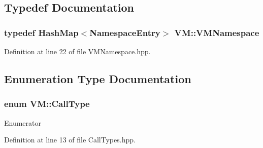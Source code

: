 \subsection{Typedef Documentation}
\hypertarget{namespace_v_m_ae5114cdcbed0f8d77a2c87137e08895e}{
\subsubsection[{V\-M\-Namespace}]{\setlength{\rightskip}{0pt plus 5cm}typedef {\bf Hash\-Map}$<${\bf Namespace\-Entry}$>$ {\bf V\-M\-::\-V\-M\-Namespace}}}\label{namespace_v_m_ae5114cdcbed0f8d77a2c87137e08895e}


Definition at line 22 of file V\-M\-Namespace.\-hpp.



\subsection{Enumeration Type Documentation}
\hypertarget{namespace_v_m_a42ff6362ed7752213fde7f8ce1249820}{
\subsubsection[{Call\-Type}]{\setlength{\rightskip}{0pt plus 5cm}enum {\bf V\-M\-::\-Call\-Type}}}\label{namespace_v_m_a42ff6362ed7752213fde7f8ce1249820}
\begin{Desc}
\item[Enumerator]\par
\begin{description}
\item[{\em 
\hypertarget{namespace_v_m_a42ff6362ed7752213fde7f8ce1249820a49848696c90794562361bf1dc78c3195}{Constant}\label{namespace_v_m_a42ff6362ed7752213fde7f8ce1249820a49848696c90794562361bf1dc78c3195}
}]\item[{\em 
\hypertarget{namespace_v_m_a42ff6362ed7752213fde7f8ce1249820a36709477febb42da8d5713f835711dfc}{Register}\label{namespace_v_m_a42ff6362ed7752213fde7f8ce1249820a36709477febb42da8d5713f835711dfc}
}]\end{description}
\end{Desc}


Definition at line 13 of file Call\-Types.\-hpp.

